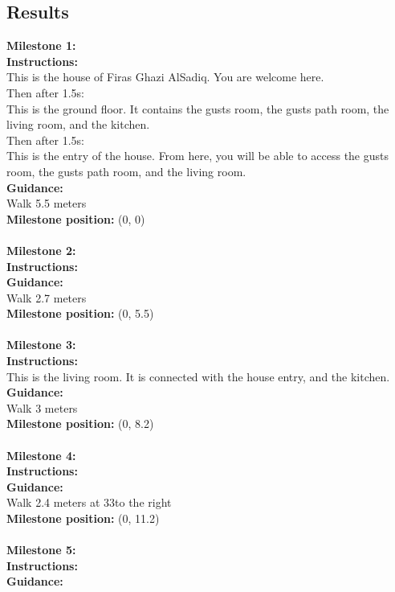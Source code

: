 \subsection{Results}
\textbf{Milestone 1:}\\
\textbf{Instructions:}\\
This is the house of Firas Ghazi AlSadiq. You are welcome here.\\
\color{green}Then after 1.5s:\color{black}\\
This is the ground floor. It contains the gusts room, the gusts path room, the living room, and the kitchen.\\
\color{green}Then after 1.5s:\color{black}\\
This is the entry of the house. From here, you will be able to access the gusts room, the gusts path room, and the living room.\\
\textbf{Guidance:}\\
Walk 5.5 meters\\
\textbf{Milestone position:} (0, 0)\\
\\
\textbf{Milestone 2:}\\
\textbf{Instructions:}\\
\textbf{Guidance:}\\
Walk 2.7 meters\\
\textbf{Milestone position:} (0, 5.5)\\
\\
\textbf{Milestone 3:}\\
\textbf{Instructions:}\\
This is the living room. It is connected with the house entry, and the kitchen.\\
\textbf{Guidance:}\\
Walk 3 meters\\
\textbf{Milestone position:} (0, 8.2)\\
\\
\textbf{Milestone 4:}\\
\textbf{Instructions:}\\
\textbf{Guidance:}\\
Walk 2.4 meters at 33\textdegree to the right\\
\textbf{Milestone position:} (0, 11.2)\\
\\
\textbf{Milestone 5:}\\
\textbf{Instructions:}\\
\textbf{Guidance:}\\
